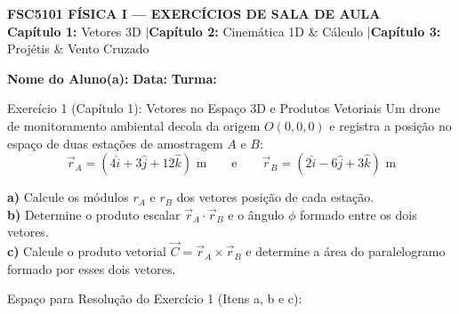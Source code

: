 \documentclass[10pt,a4paper]{article}
\begin{document}
\begin{tcolorbox}[colback=primaryblue,colframe=accentcyan,coltext=white,arc=4pt,top=5pt,bottom=5pt]
    \begin{center}
        {\Large \bfseries FSC5101 FÍSICA I --- EXERCÍCIOS DE SALA DE AULA}\\[2pt]
        {\small \textbf{Capítulo 1:} Vetores 3D \quad$\vert$\quad \textbf{Capítulo 2:} Cinemática 1D \& Cálculo \quad$\vert$\quad \textbf{Capítulo 3:} Projétis \& Vento Cruzado}
    \end{center}
\end{tcolorbox}

\vspace{2pt}

\begin{tcolorbox}[colback=boxbg,colframe=gray!40,boxrule=0.5pt,top=4pt,bottom=4pt]
    \small
    \textbf{Nome do Aluno(a):} \underline{\hspace{8.5cm}} \quad \textbf{Data:} \underline{\hspace{2.2cm}} \quad \textbf{Turma:} \underline{\hspace{1.5cm}}
\end{tcolorbox}

\vspace{4pt}

\begin{problembox}{Exercício 1 (Capítulo 1): Vetores no Espaço 3D e Produtos Vetoriais}
Um drone de monitoramento ambiental decola da origem $O(0, 0, 0)$ e registra a posição no espaço de duas estações de amostragem $A$ e $B$:
$$\vec{r}_A = (4\hat{i} + 3\hat{j} + 12\hat{k})\text{ m} \qquad \text{e} \qquad \vec{r}_B = (2\hat{i} - 6\hat{j} + 3\hat{k})\text{ m}$$

\textbf{a)} Calcule os módulos $r_A$ e $r_B$ dos vetores posição de cada estação.\\
\textbf{b)} Determine o produto escalar $\vec{r}_A \cdot \vec{r}_B$ e o ângulo $\phi$ formado entre os dois vetores.\\
\textbf{c)} Calcule o produto vetorial $\vec{C} = \vec{r}_A \times \vec{r}_B$ e determine a área do paralelogramo formado por esses dois vetores.
\end{problembox}

\begin{solutionarea}{Espaço para Resolução do Exercício 1 (Itens a, b e c):}
    \vspace{6.8cm}
\end{solutionarea}
\end{document}
